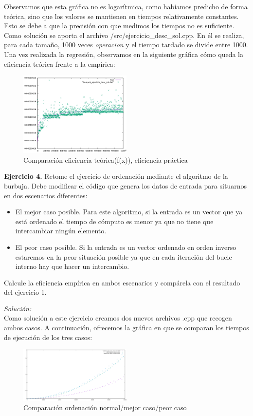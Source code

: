 \documentclass[titlepage, 12pt,a4paper]{article}
\begin{document}
	Observamos que esta gráfica no es logarítmica, como habíamos predicho de forma teórica, sino que los valores se mantienen en tiempos relativamente constantes. Esto se debe a que la precisión con que medimos los tiempos no es suficiente. Como solución se aporta el archivo /src/ejercicio\_desc\_sol.cpp. En él se realiza, para cada tamaño, 1000 veces \textit{operacion} y el tiempo tardado se divide entre 1000.
	Una vez realizada la regresión, observamos en la siguiente gráfica cómo queda la eficiencia teórica frente a la empírica:
	\begin{figure}[!ht]
  \caption{Comparación eficiencia teórica(f(x)), eficiencia práctica}
  \centering
    \includegraphics[width=0.5\textwidth]{./img/ef_pract_ej_3_2.png}
\end{figure}
\newpage
  
	\textbf{\large Ejercicio 4.} Retome el ejercicio de ordenación mediante el algoritmo de la burbuja. Debe modificar el código que genera los datos de entrada para situarnos en dos escenarios diferentes:
	\begin{itemize}
	\item	El mejor caso posible. Para este algoritmo, si la entrada es un vector que ya está ordenado el tiempo de cómputo es menor ya que no tiene que intercambiar ningún elemento.
	\item	El peor caso posible. Si la entrada es un vector ordenado en orden inverso estaremos en la peor situación posible ya que en cada iteración del bucle interno hay que hacer un intercambio. 
	\end{itemize}
	Calcule la eficiencia empírica en ambos escenarios y compárela con el resultado del ejercicio 1.
\vspace {1em}	

\underline{\emph{Solución:}}\\
Como solución a este ejercicio creamos dos nuevos archivos .cpp que recogen ambos casos. A continuación, ofrecemos la gráfica en que se comparan los tiempos de ejecución de los tres casos:

\begin{figure}[!ht]
  \caption{Comparación ordenación normal/mejor caso/peor caso}
  \centering
    \includegraphics[width=0.5\textwidth]{./img/ef_pract_ej_4.png}
\end{figure}  
\end{document}
